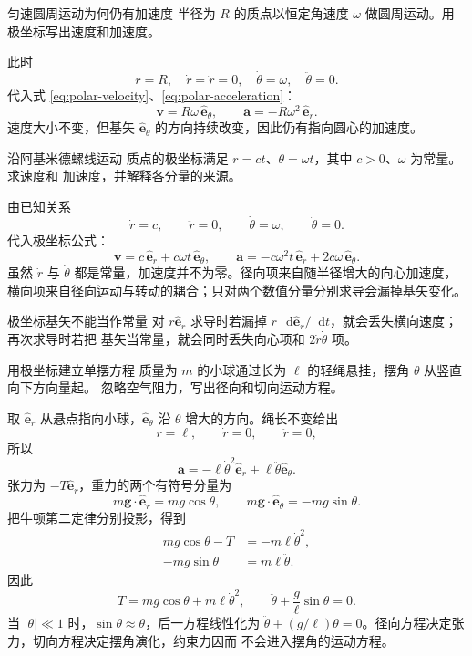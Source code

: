 \documentclass[UTF8,zihao=-4,oneside,openany]{ctexbook}
\numberwithin{equation}{section}
\newcommand{\dd}{\mathop{}\!\mathrm{d}}
\newcommand{\vect}[1]{\bm{#1}}
\newcommand{\uvec}[1]{\hat{\vect{#1}}}
\begin{document}
\begin{examplebox}{匀速圆周运动为何仍有加速度}
半径为 $R$ 的质点以恒定角速度 $\omega$ 做圆周运动。用极坐标写出速度和加速度。

\tcblower
此时
\[
  r=R,\quad \dot r=\ddot r=0,\quad
  \dot\theta=\omega,\quad \ddot\theta=0.
\]
代入式 \eqref{eq:polar-velocity}、\eqref{eq:polar-acceleration}：
\[
  \vect v=R\omega\,\uvec e_\theta,
  \qquad
  \vect a=-R\omega^2\,\uvec e_r.
\]
速度大小不变，但基矢 $\uvec e_\theta$ 的方向持续改变，因此仍有指向圆心的加速度。
\end{examplebox}

\begin{examplebox}{沿阿基米德螺线运动}
质点的极坐标满足 $r=ct$、$\theta=\omega t$，其中 $c>0$、$\omega$ 为常量。求速度和
加速度，并解释各分量的来源。

\tcblower
由已知关系
\[
  \dot r=c,\qquad \ddot r=0,\qquad
  \dot\theta=\omega,\qquad \ddot\theta=0.
\]
代入极坐标公式：
\[
  \vect v=c\,\uvec e_r+c\omega t\,\uvec e_\theta,
  \qquad
  \vect a=-c\omega^2t\,\uvec e_r+2c\omega\,\uvec e_\theta.
\]
虽然 $\dot r$ 与 $\dot\theta$ 都是常量，加速度并不为零。径向项来自随半径增大的向心加速度，
横向项来自径向运动与转动的耦合；只对两个数值分量分别求导会漏掉基矢变化。
\end{examplebox}

\begin{warningbox}{极坐标基矢不能当作常量}
对 $r\uvec e_r$ 求导时若漏掉 $r\,\dd\uvec e_r/\dd t$，就会丢失横向速度；再次求导时若把
基矢当常量，就会同时丢失向心项和 $2\dot r\dot\theta$ 项。
\end{warningbox}

\begin{examplebox}{用极坐标建立单摆方程}
质量为 $m$ 的小球通过长为 $\ell$ 的轻绳悬挂，摆角 $\theta$ 从竖直向下方向量起。
忽略空气阻力，写出径向和切向运动方程。

\tcblower
取 $\uvec e_r$ 从悬点指向小球，$\uvec e_\theta$ 沿 $\theta$ 增大的方向。绳长不变给出
\[
  r=\ell,\qquad \dot r=0,\qquad \ddot r=0,
\]
所以
\begin{equation}
  \vect a=-\ell\dot\theta^2\uvec e_r
  +\ell\ddot\theta\uvec e_\theta.
  \label{eq:pendulum-polar-acceleration}
\end{equation}
张力为 $-T\uvec e_r$，重力的两个有符号分量为
\[
  m\vect g\cdot\uvec e_r=mg\cos\theta,
  \qquad
  m\vect g\cdot\uvec e_\theta=-mg\sin\theta.
\]
把牛顿第二定律分别投影，得到
\begin{align}
  mg\cos\theta-T&=-m\ell\dot\theta^2,
  \label{eq:pendulum-radial}\\
  -mg\sin\theta&=m\ell\ddot\theta.
  \label{eq:pendulum-tangential}
\end{align}
因此
\[
  T=mg\cos\theta+m\ell\dot\theta^2,
  \qquad
  \ddot\theta+\frac{g}{\ell}\sin\theta=0.
\]
当 $|\theta|\ll1$ 时，$\sin\theta\approx\theta$，后一方程线性化为
$\ddot\theta+(g/\ell)\theta=0$。径向方程决定张力，切向方程决定摆角演化，约束力因而
不会进入摆角的运动方程。
\end{examplebox}
\end{document}
